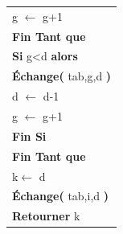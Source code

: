 \documentclass[10pt]{article}
\begin{document}
\begin{pseudo}
\begin{center}
\begin{tabular}{p{}}
\hspace{1.2cm} \textsf{g $\leftarrow$ g+1}\\  
\hspace{.8cm} \textbf{Fin Tant que}  \\
\hspace{.8cm} \textbf{Si} \textsf{g<d} \textbf{alors} \\
\hspace{1.2cm} \textbf{Échange(} \textsf{tab,g,d} \textbf{)} \\
\hspace{1.2cm} \textsf{d $\leftarrow$ d-1}\\  
\hspace{1.2cm} \textsf{g $\leftarrow$ g+1}\\  
\hspace{.8cm} \textbf{Fin Si} \\
\hspace{.4cm} \textbf{Fin Tant que}  \\
\hspace{.4cm} \textsf{k$\leftarrow$ d}  \\
\hspace{.4cm} \textbf{Échange(} \textsf{tab,i,d} \textbf{)} \\
\hspace{.4cm} \textbf{Retourner} \textsf{k}  \\
\hline
\end{tabular}
\end{center}




\end{pseudo}
\end{document}
